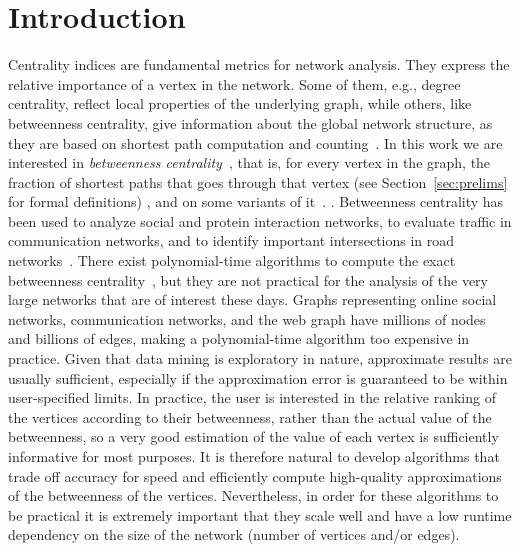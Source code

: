 \section{Introduction}\label{sec:intro}
Centrality indices are fundamental metrics for network analysis. They express the
relative importance of a vertex in the network. Some of them, e.g., degree
centrality, reflect local properties of the underlying graph, while others,
like betweenness centrality, give information about the global network
structure, as they are based on shortest path computation and counting~\citep{Newman10}. In
this work we are interested in \emph{betweenness
centrality}~\citep{Anthonisse71,Freeman77}, that is, for every vertex in the
graph, the fraction of shortest paths that goes through that vertex (see
Section~\ref{sec:prelims} for formal definitions)
\ifproof
, and on some variants of it~\citep{OpsahlAS10,BorgattiE06,Brandes08}. %
\else
. %
\fi
Betweenness centrality has been used to analyze social and protein interaction
networks, to evaluate traffic in communication networks, and to identify
important intersections in road networks~\citep{Newman10,GeisbergerSS08}. There
exist polynomial-time algorithms to compute the exact betweenness
centrality~\citep{Brandes01}, but they are not practical for the analysis of the
very large networks that are of interest these days. Graphs representing online
social networks, communication networks, and the web graph have millions of
nodes and billions of edges, making a polynomial-time algorithm too expensive in
practice. Given that data mining is exploratory in nature, approximate results
are usually sufficient, especially if the approximation error is guaranteed to
be within user-specified limits. In practice, the user is interested in the
relative ranking of the vertices according to their betweenness, rather than the
actual value of the betweenness, so a very good estimation of the value of each
vertex is sufficiently informative for most purposes. It is therefore natural to
develop algorithms that trade off accuracy for speed and efficiently compute
high-quality approximations of the betweenness of the vertices.  Nevertheless,
in order for these algorithms to be practical it is extremely important that
they scale well and have a low runtime dependency on the size of the network
(number of vertices and/or edges).

